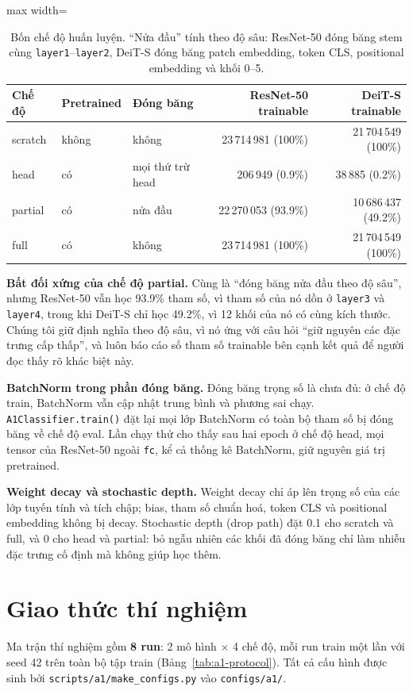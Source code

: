 \begin{table}[htbp]
\centering
\caption{Bốn chế độ huấn luyện. ``Nửa đầu'' tính theo độ sâu: ResNet-50 đóng băng stem cùng \texttt{layer1}--\texttt{layer2}, DeiT-S đóng băng patch embedding, token CLS, positional embedding và khối 0--5.}
\label{tab:a1-modes}
\small
\begin{adjustbox}{max width=\linewidth}
\begin{tabular}{lllrr}
\toprule
Chế độ & Pretrained & Đóng băng & ResNet-50 trainable & DeiT-S trainable \\
\midrule
scratch & không & không & 23\,714\,981 (100\%) & 21\,704\,549 (100\%) \\
head & có & mọi thứ trừ head & 206\,949 (0.9\%) & 38\,885 (0.2\%) \\
partial & có & nửa đầu & 22\,270\,053 (93.9\%) & 10\,686\,437 (49.2\%) \\
full & có & không & 23\,714\,981 (100\%) & 21\,704\,549 (100\%) \\
\bottomrule
\end{tabular}
\end{adjustbox}
\end{table}

\textbf{Bất đối xứng của chế độ partial.} Cùng là ``đóng băng nửa đầu theo độ sâu'', nhưng ResNet-50 vẫn học 93.9\% tham số, vì tham số của nó dồn ở \texttt{layer3} và \texttt{layer4}, trong khi DeiT-S chỉ học 49.2\%, vì 12 khối của nó có cùng kích thước. Chúng tôi giữ định nghĩa theo độ sâu, vì nó ứng với câu hỏi ``giữ nguyên các đặc trưng cấp thấp'', và luôn báo cáo số tham số trainable bên cạnh kết quả để người đọc thấy rõ khác biệt này.

\textbf{BatchNorm trong phần đóng băng.} Đóng băng trọng số là chưa đủ: ở chế độ train, BatchNorm vẫn cập nhật trung bình và phương sai chạy. \texttt{A1Classifier.train()} đặt lại mọi lớp BatchNorm có toàn bộ tham số bị đóng băng về chế độ eval. Lần chạy thử cho thấy sau hai epoch ở chế độ head, mọi tensor của ResNet-50 ngoài \texttt{fc}, kể cả thống kê BatchNorm, giữ nguyên giá trị pretrained.

\textbf{Weight decay và stochastic depth.} Weight decay chỉ áp lên trọng số của các lớp tuyến tính và tích chập; bias, tham số chuẩn hoá, token CLS và positional embedding không bị decay. Stochastic depth (drop path) đặt 0.1 cho scratch và full, và 0 cho head và partial: bỏ ngẫu nhiên các khối đã đóng băng chỉ làm nhiễu đặc trưng cố định mà không giúp học thêm.

\section{Giao thức thí nghiệm}\label{sec:a1-protocol}
Ma trận thí nghiệm gồm \textbf{8 run}: 2 mô hình \(\times\) 4 chế độ, mỗi run train một lần với seed 42 trên toàn bộ tập train (Bảng~\ref{tab:a1-protocol}). Tất cả cấu hình được sinh bởi \texttt{scripts/a1/make\_configs.py} vào \texttt{configs/a1/}.


